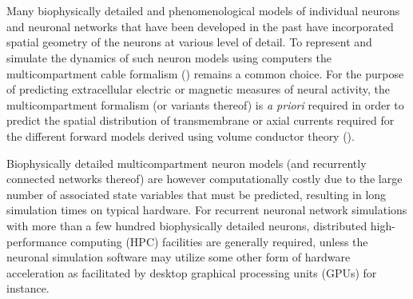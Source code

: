 \section{}
\label{sec:Schemes:networkLFPy}



\section{}
\label{sec:Schemes:HybridLFPy}


Many biophysically detailed and phenomenological models of individual neurons and neuronal networks that have been developed in the past have incorporated spatial geometry of the neurons at various level of detail.
To represent and simulate the dynamics of such neuron models using computers the multicompartment cable formalism () remains a common choice.
For the purpose of predicting extracellular electric or magnetic measures of neural activity,
the multicompartment formalism (or variants thereof) is \emph{a priori} required in order to predict the spatial distribution of transmembrane or axial currents required for the different forward models derived using volume conductor theory ().

Biophysically detailed multicompartment neuron models (and recurrently connected networks thereof) are however computationally costly due to the large number of associated state variables that must be predicted,
resulting in long simulation times on typical hardware.
For recurrent neuronal network simulations with more than a few hundred biophysically detailed neurons, distributed high-performance computing (HPC) facilities are generally required,
unless the neuronal simulation software may utilize some other form of hardware acceleration as facilitated by desktop graphical processing units (GPUs) for instance.

